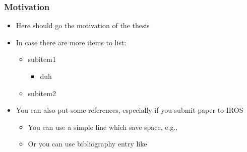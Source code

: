 
\begin{frame}
   \frametitle{Motivation}
   \begin{itemize} \justifying %
      \item Here should go the motivation of the thesis
      \item In case there are more items to list:
	   \begin{itemize} \justifying
         \item subitem1
	      \begin{itemize}
            \item duh
         \end{itemize}
	      \item subitem2
	   \end{itemize}
   \end{itemize}
   
   \begin{itemize}
      \item You can also put some references, especially if you submit paper to IROS

   \begin{itemize}
      \item You can use a simple line which save space, e.g., 
   \end{itemize}
\hspace*{0.5em}
   \begin{itemize}
      \item Or you can use bibliography entry like 
   \end{itemize}
   \end{itemize}
\end{frame}

